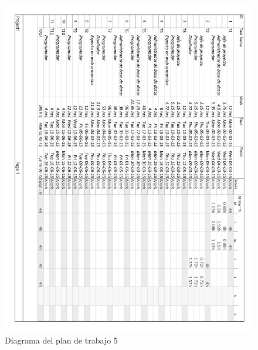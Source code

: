 \begin{figure}[!htp]
	\centering
	\includegraphics[page=5, scale=.8]{fig/real_work_plan_diagram}
	\caption{Diagrama del plan de trabajo 5}
\end{figure}

